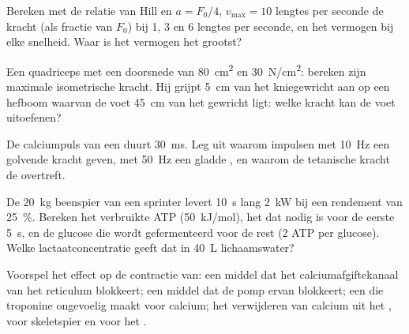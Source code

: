 \begin{exercise}[$\star\star$]\label{exo:b2:muscle-movement:7}
Bereken met de relatie van Hill en $a = F_0/4$, $v_{\max} = 10$ lengtes per
seconde de kracht (als fractie van $F_0$) bij 1, 3 en 6 lengtes per seconde,
en het vermogen bij elke snelheid. Waar is het vermogen het grootst?
\end{exercise}

\begin{exercise}[$\star\star$]\label{exo:b2:muscle-movement:8}
Een quadriceps met een doorsnede van \qty{80}{cm^2} en \qty{30}{N/cm^2}:
bereken zijn maximale isometrische kracht. Hij grijpt \qty{5}{cm} van het
kniegewricht aan op een hefboom waarvan de voet \qty{45}{cm} van het gewricht
ligt: welke kracht kan de voet uitoefenen?
\end{exercise}

\begin{exercise}[$\star\star$]\label{exo:b2:muscle-movement:9}
De calciumpuls van een  duurt \qty{30}{ms}. Leg uit
waarom impulsen met \qty{10}{Hz} een golvende kracht geven, met \qty{50}{Hz}
een gladde , en waarom de tetanische kracht de  overtreft.
\end{exercise}

\begin{exercise}[$\star\star\star$]\label{exo:b2:muscle-movement:10}
De \qty{20}{kg} beenspier van een sprinter levert \qty{10}{s} lang
\qty{2}{kW} bij een rendement van \qty{25}{\%}. Bereken het verbruikte ATP
(\qty{50}{kJ/mol}), het  dat nodig is voor de eerste
\qty{5}{s}, en de glucose die wordt gefermenteerd voor de rest (2 ATP per
glucose). Welke lactaatconcentratie geeft dat in \qty{40}{L} lichaamswater?
\end{exercise}

\begin{exercise}[$\star\star\star$]\label{exo:b2:muscle-movement:11}
Voorspel het effect op de contractie van: een middel dat het
calciumafgiftekanaal van het reticulum blokkeert; een middel dat de pomp
ervan blokkeert; een  die troponine ongevoelig maakt voor calcium; het
verwijderen van calcium uit het , voor skeletspier en voor het .
\end{exercise}

